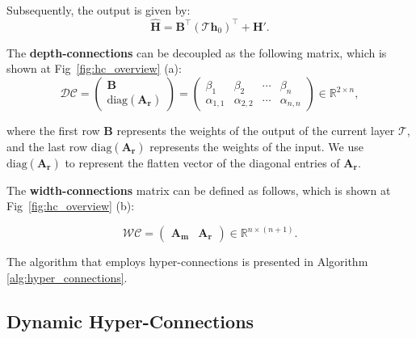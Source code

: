 \documentclass{article} %
\begin{document}

Subsequently, the output is given by:
\begin{equation} \label{eq:dc}
\mathbf{\hat{H}}=\mathbf{B}^\intercal (\mathcal{T}\mathbf{h}_0)^\intercal + \mathbf{H'}.
\end{equation}


The \textbf{depth-connections} can be decoupled as the following matrix, which is shown at Fig~\ref{fig:hc_overview} (a):
\begin{equation}
\mathcal{DC} = \begin{pmatrix}
\mathbf{B} \\
\text{diag}(\mathbf{A_r})
\end{pmatrix} = \begin{pmatrix}
\beta_{1} & \beta_{2} & \cdots & \beta_{n} \\
\alpha_{1,1} & \alpha_{2,2}  & \cdots & \alpha_{n, n}
\end{pmatrix} \in \mathbb{R}^{2 \times n},
\end{equation}

where the first row $\mathbf{B}$ represents the weights of the output of the current layer $\mathcal{T}$, and the last row $\text{diag}(\mathbf{A_r})$ represents the weights of the input. We use $\text{diag}(\mathbf{A_r})$ to represent the flatten vector of the diagonal entries of $\mathbf{A_r}$. 

The \textbf{ width-connections} matrix can be defined as follows, which is shown at Fig~\ref{fig:hc_overview} (b):

\begin{equation} \label{eq:wcm}
\mathcal{WC} = \begin{pmatrix}
\mathbf{A_m} & \mathbf{A_r}
\end{pmatrix} \in \mathbb{R}^{n\times (n+1)}.
\end{equation}

The algorithm that employs hyper-connections is presented in Algorithm \ref{alg:hyper_connections}. 



\subsection{Dynamic Hyper-Connections}
\end{document}
